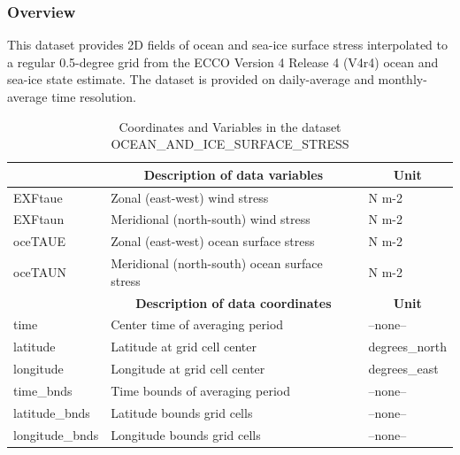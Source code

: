 \subsubsection{Overview}
This dataset provides 2D fields of ocean and sea-ice surface stress interpolated to a regular 0.5-degree grid from the ECCO Version 4 Release 4 (V4r4) ocean and sea-ice state estimate. The dataset is provided on daily-average and monthly-average time resolution. 
\begin{longtable}{|m{}|m{}|m{}|}
\caption{Coordinates and Variables in the dataset OCEAN\_AND\_ICE\_SURFACE\_STRESS}
\label{tab:table-OCEAN_AND_ICE_SURFACE_STRESS-fields} \\ 
\hline \endhead \hline \endfoot
\rowcolor{lightgray} \multicolumn{1}{|c|}{\textbf{Variables}} & \multicolumn{1}{|c|}{\textbf{Description of data variables}} &  \multicolumn{1}{|c|}{\textbf{Unit}}\\ \hline
EXFtaue &Zonal (east-west) wind stress &N m-2  \\ \hline
EXFtaun &Meridional (north-south) wind stress &N m-2  \\ \hline
oceTAUE &Zonal (east-west) ocean surface stress &N m-2  \\ \hline
oceTAUN &Meridional (north-south) ocean surface stress &N m-2  \\ \hline
\rowcolor{lightgray} \multicolumn{1}{|c|}{\textbf{Coordinates}} & \multicolumn{1}{|c|}{\textbf{Description of data coordinates}} &  \multicolumn{1}{|c|}{\textbf{Unit}}\\ \hline
time &Center time of averaging period &--none--  \\ \hline
latitude &Latitude at grid cell center &degrees\_north  \\ \hline
longitude &Longitude at grid cell center &degrees\_east  \\ \hline
time\_bnds &Time bounds of averaging period &--none--  \\ \hline
latitude\_bnds &Latitude bounds grid cells &--none--  \\ \hline
longitude\_bnds &Longitude bounds grid cells &--none--  \\ \hline
\end{longtable}

\newp
\pagebreak
